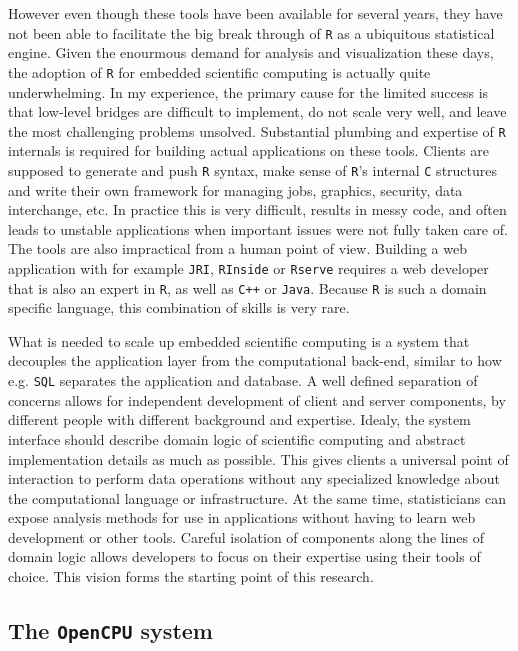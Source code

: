 \documentclass{article}
\newcommand{\R}{\texttt{R}\xspace}
\newcommand{\OpenCPU}{\texttt{OpenCPU}\xspace}
\begin{document}
However even though these tools have been available for several years, they have not been able to facilitate the big break through of \R as a ubiquitous statistical engine. Given the enourmous demand for analysis and visualization these days, the adoption of \R for embedded scientific computing is actually quite underwhelming. In my experience, the primary cause for the limited success is that low-level bridges are difficult to implement, do not scale very well, and leave the most challenging problems unsolved. Substantial plumbing and expertise of \R internals is required for building actual applications on these tools. Clients are supposed to generate and push \R syntax, make sense of \R's internal \texttt{C} structures and write their own framework for managing jobs, graphics, security, data interchange, etc. In practice this is very difficult, results in messy code, and often leads to unstable applications when important issues were not fully taken care of. The tools are also impractical from a human point of view. Building a web application with for example \texttt{JRI}, \texttt{RInside} or \texttt{Rserve} requires a web developer that is also an expert in \R, as well as \texttt{C++} or \texttt{Java}. Because \R is such a domain specific language, this combination of skills is very rare. 

What is needed to scale up embedded scientific computing is a system that decouples the application layer from the computational back-end, similar to how e.g. \texttt{SQL} separates the application and database. A well defined separation of concerns allows for independent development of client and server components, by different people with different background and expertise. Idealy, the system interface should describe domain logic of scientific computing and abstract implementation details as much as possible. This gives clients a universal point of interaction to perform data operations without any specialized knowledge about the computational language or infrastructure. At the same time, statisticians can expose analysis methods for use in applications without having to learn web development or other tools. Careful isolation of components along the lines of domain logic allows developers to focus on their expertise using their tools of choice. This vision forms the starting point of this research. 




\subsection{The \OpenCPU system}
\end{document}
